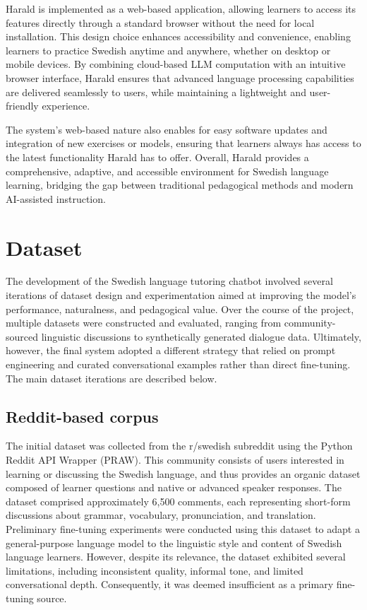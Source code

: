 \documentclass[a4paper,10pt]{article}
\begin{document}
Harald is implemented as a web-based application, allowing learners to access its features directly through a standard browser without the need for local installation. This design choice enhances accessibility and convenience, enabling learners to practice Swedish anytime and anywhere, whether on desktop or mobile devices. By combining cloud-based LLM computation with an intuitive browser interface, Harald ensures that advanced language processing capabilities are delivered seamlessly to users, while maintaining a lightweight and user-friendly experience.

The system’s web-based nature also enables for easy software updates and integration of new exercises or models, ensuring that learners always has access to the latest functionality Harald has to offer. Overall, Harald provides a comprehensive, adaptive, and accessible environment for Swedish language learning, bridging the gap between traditional pedagogical methods and modern AI-assisted instruction.

\section{Dataset}

The development of the Swedish language tutoring chatbot involved several iterations of dataset design and experimentation aimed at improving the model’s performance, naturalness, and pedagogical value. Over the course of the project, multiple datasets were constructed and evaluated, ranging from community-sourced linguistic discussions to synthetically generated dialogue data. Ultimately, however, the final system adopted a different strategy that relied on prompt engineering and curated conversational examples rather than direct fine-tuning. The main dataset iterations are described below.

\subsection{Reddit-based corpus}
The initial dataset was collected from the r/swedish subreddit using the Python Reddit API Wrapper (PRAW). This community consists of users interested in learning or discussing the Swedish language, and thus provides an organic dataset composed of learner questions and native or advanced speaker responses. The dataset comprised approximately 6,500 comments, each representing short-form discussions about grammar, vocabulary, pronunciation, and translation. Preliminary fine-tuning experiments were conducted using this dataset to adapt a general-purpose language model to the linguistic style and content of Swedish language learners. However, despite its relevance, the dataset exhibited several limitations, including inconsistent quality, informal tone, and limited conversational depth. Consequently, it was deemed insufficient as a primary fine-tuning source.
\end{document}
